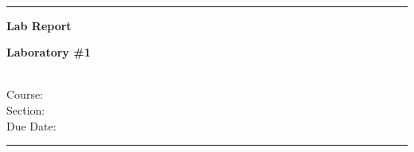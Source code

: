 \documentclass[12pt]{article}
\newcommand{\fullname}{}
\newcommand{\university}{}
\newcommand{\department}{}
\newcommand{\coursename}{}
\newcommand{\sectionname}{}
\newcommand{\duedate}{}
\newcommand{\labtitle}{}
\newcommand{\labnumber}{\#1}
\newif\iffigures
\newif\iftables
\newif\ifcode
\renewcommand\_{\textunderscore\allowbreak}
\begin{document}

\begin{titlepage}
    \begin{center}
    	\scriptsize \textbf{\university\\}
    	\bigskip

        \noindent\rule{\textwidth}{20pt}

        \mbox{}
        \vfill

        \Huge
        \color{UniColor}
        \textbf{Lab Report}

        \mbox{}
        \vfill

        \LARGE
        \textbf{Laboratory \labnumber}\\
        \color{black}
        \labtitle

        \mbox{}
        \vfill

		\normalsize
        \fullname\\
		\medskip
		Course: \coursename\\
		Section: \sectionname\\
		\medskip
		Due Date: \duedate

        \mbox{}
        \vfill

        \noindent\rule{\textwidth}{20pt}

        \bigskip
    	\scriptsize \textbf{\department\\}
    \end{center}
\end{titlepage}



\renewcommand\contentsname{Table of Contents}
\tableofcontents
\newpage

\iffigures
    \listoffigures
    \newpage
\fi

\iftables
    \listoftables
    \newpage
\fi

\ifcode
    \lstlistoflistings
    \newpage
\fi
















\end{document}
